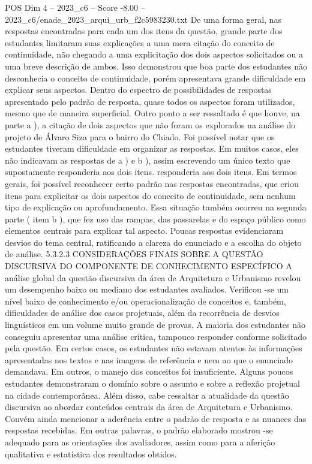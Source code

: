\begin{textsample}{POS Dim 4 – 2023\_c6 – Score -8.00 – 2023\_c6/enade\_2023\_arqui\_urb\_f2c5983230.txt}
De uma forma geral, nas respostas encontradas para cada um dos itens da questão, grande parte dos estudantes limitaram suas explicações a uma mera citação do conceito de continuidade, não chegando a uma explicitação dos dois aspectos solicitados ou a uma breve descrição de ambos.
Isso demonstrou que boa parte dos estudantes não desconhecia o conceito de continuidade, porém apresentava grande dificuldade em explicar seus aspectos.
Dentro do espectro de possibilidades de respostas apresentado pelo padrão de resposta, quase todos os aspectos foram utilizados, mesmo que de maneira superficial.
Outro ponto a ser ressaltado é que houve, na parte a ), a citação de dois aspectos que não foram os explorados na análise do projeto de Álvaro Siza para o bairro do Chiado.
Foi possível notar que os estudantes tiveram dificuldade em organizar as respostas.
Em muitos casos, eles não indicavam as respostas de a ) e b ), assim escrevendo um único texto que supostamente responderia aos dois itens. responderia aos dois itens.
Em termos gerais, foi possível reconhecer certo padrão nas respostas encontradas, que criou itens para explicitar os dois aspectos do conceito de continuidade, sem nenhum tipo de explicação ou aprofundamento.
Essa situação também ocorreu na segunda parte ( item b ), que fez uso das rampas, das passarelas e do espaço público como elementos centrais para explicar tal aspecto.
Poucas respostas evidenciaram desvios do tema central, ratificando a clareza do enunciado e a escolha do objeto de análise. 5.3.2.3 CONSIDERAÇÕES FINAIS SOBRE A QUESTÃO DISCURSIVA DO COMPONENTE DE CONHECIMENTO ESPECÍFICO A análise global da questão discursiva da área de Arquitetura e Urbanismo revelou um desempenho baixo ou mediano dos estudantes avaliados.
Verificou -se um nível baixo de conhecimento e/ou operacionalização de conceitos e, também, dificuldades de análise dos casos projetuais, além da recorrência de desvios linguísticos em um volume muito grande de provas.
A maioria dos estudantes não conseguiu apresentar uma análise crítica, tampouco responder conforme solicitado pela questão.
Em certos casos, os estudantes não estavam atentos às informações apresentadas nos textos e nas imagens de referência e nem ao que o enunciado demandava.
Em outros, o manejo dos conceitos foi insuficiente.
Alguns poucos estudantes demonstraram o domínio sobre o assunto e sobre a reflexão projetual na cidade contemporânea.
Além disso, cabe ressaltar a atualidade da questão discursiva ao abordar conteúdos centrais da área de Arquitetura e Urbanismo.
Convém ainda mencionar a aderência entre o padrão de resposta e as nuances das respostas recebidas.
Em outras palavras, o padrão elaborado mostrou -se adequado para as orientações dos avaliadores, assim como para a aferição qualitativa e estatística dos resultados obtidos.

\end{textsample}
